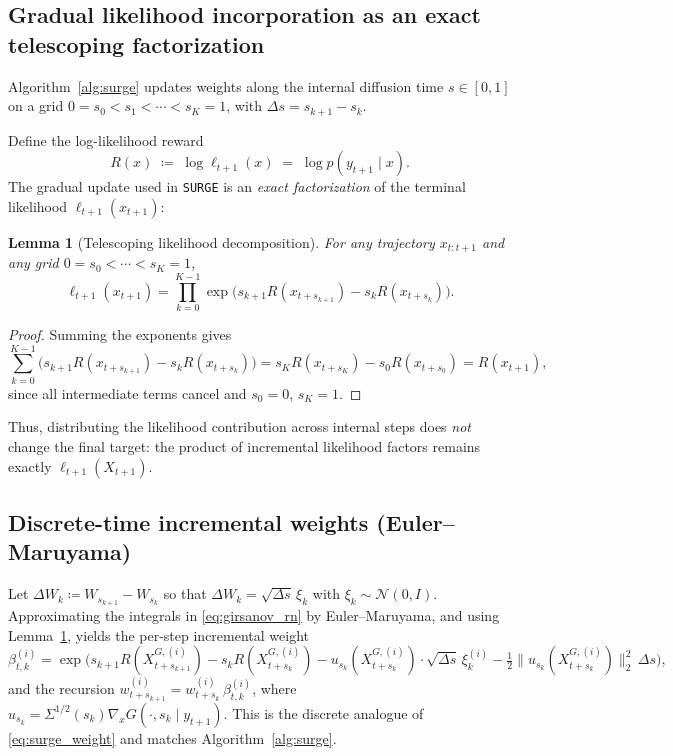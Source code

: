 \documentclass{article}
\theoremstyle{plain}
\newtheorem{lemma}[theorem]{Lemma}
\theoremstyle{definition}
\theoremstyle{remark}
\begin{document}
\subsection{Gradual likelihood incorporation as an exact telescoping factorization}

Algorithm~\ref{alg:surge} updates weights along the internal diffusion time $s\in[0,1]$ on a grid
$0=s_0<s_1<\cdots<s_K=1$, with $\Delta s=s_{k+1}-s_k$.

Define the log-likelihood reward
\[
R(x)\;\coloneqq\;\log \ell_{t+1}(x)\;=\;\log p(y_{t+1}\mid x).
\]
The gradual update used in \texttt{SURGE} is an \emph{exact factorization} of the terminal likelihood
$\ell_{t+1}(x_{t+1})$:

\begin{lemma}[Telescoping likelihood decomposition]
\label{lem:telescoping}
For any trajectory $x_{t:t+1}$ and any grid $0=s_0<\cdots<s_K=1$,
\begin{equation}
\label{eq:telescoping_like}
\ell_{t+1}(x_{t+1})
=
\prod_{k=0}^{K-1}\exp\!\Big(s_{k+1}R(x_{t+s_{k+1}})-s_kR(x_{t+s_k})\Big).
\end{equation}
\end{lemma}

\begin{proof}
Summing the exponents gives
\[
\sum_{k=0}^{K-1}\big(s_{k+1}R(x_{t+s_{k+1}})-s_kR(x_{t+s_k})\big)
=
s_KR(x_{t+s_K})-s_0R(x_{t+s_0})
=
R(x_{t+1}),
\]
since all intermediate terms cancel and $s_0=0$, $s_K=1$.
\end{proof}

Thus, distributing the likelihood contribution across internal steps does \emph{not} change the final target:
the product of incremental likelihood factors remains exactly $\ell_{t+1}(X_{t+1})$.

\subsection{Discrete-time incremental weights (Euler--Maruyama)}

Let $\Delta W_k \coloneqq W_{s_{k+1}}-W_{s_k}$ so that $\Delta W_k=\sqrt{\Delta s}\,\xi_k$ with
$\xi_k\sim\mathcal N(0,I)$. Approximating the integrals in \eqref{eq:girsanov_rn} by Euler--Maruyama,
and using Lemma~\ref{lem:telescoping}, yields the per-step incremental weight
\begin{equation}
\label{eq:beta_correct}
\beta_{t,k}^{(i)}
=
\exp\!\Big(
s_{k+1}R(X_{t+s_{k+1}}^{G,(i)})-s_kR(X_{t+s_k}^{G,(i)})
- u_{s_k}(X_{t+s_k}^{G,(i)})\cdot \sqrt{\Delta s}\,\xi_k^{(i)}
-\tfrac12\|u_{s_k}(X_{t+s_k}^{G,(i)})\|_2^2\,\Delta s
\Big),
\end{equation}
and the recursion $w_{t+s_{k+1}}^{(i)} = w_{t+s_k}^{(i)}\,\beta_{t,k}^{(i)}$, where
$u_{s_k}=\Sigma^{1/2}(s_k)\nabla_xG(\cdot,s_k\mid y_{t+1})$. This is the discrete analogue of
\eqref{eq:surge_weight} and matches Algorithm~\ref{alg:surge}.
\end{document}
